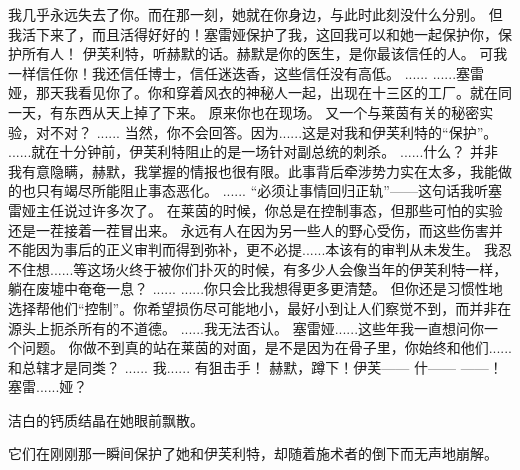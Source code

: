 \documentclass[openany]{book}
\begin{document}
\begin{dialogue}
     我几乎永远失去了你。而在那一刻，她就在你身边，与此时此刻没什么分别。
     但我活下来了，而且活得好好的！塞雷娅保护了我，这回我可以和她一起保护你，保护所有人！
     伊芙利特，听赫默的话。赫默是你的医生，是你最该信任的人。
     可我一样信任你！我还信任博士，信任迷迭香，这些信任没有高低。
     ......
     ......塞雷娅，那天我看见你了。你和穿着风衣的神秘人一起，出现在十三区的工厂。就在同一天，有东西从天上掉了下来。
     原来你也在现场。
     又一个与莱茵有关的秘密实验，对不对？
     ......
     当然，你不会回答。因为......这是对我和伊芙利特的“保护”。
     ......就在十分钟前，伊芙利特阻止的是一场针对副总统的刺杀。
     ......什么？
     并非我有意隐瞒，赫默，我掌握的情报也很有限。此事背后牵涉势力实在太多，我能做的也只有竭尽所能阻止事态恶化。
     ......
     “必须让事情回归正轨”——这句话我听塞雷娅主任说过许多次了。
     在莱茵的时候，你总是在控制事态，但那些可怕的实验还是一茬接着一茬冒出来。
     永远有人在因为另一些人的野心受伤，而这些伤害并不能因为事后的正义审判而得到弥补，更不必提......本该有的审判从未发生。
     我忍不住想......等这场火终于被你们扑灭的时候，有多少人会像当年的伊芙利特一样，躺在废墟中奄奄一息？
     ......
     ......你只会比我想得更多更清楚。
     但你还是习惯性地选择帮他们“控制”。你希望损伤尽可能地小，最好小到让人们察觉不到，而并非在源头上扼杀所有的不道德。
     ......我无法否认。
     塞雷娅......这些年我一直想问你一个问题。
     你做不到真的站在莱茵的对面，是不是因为在骨子里，你始终和他们......和总辖才是同类？
     ......
     我......
     有狙击手！
     赫默，蹲下！伊芙——
     什——
     ——！
     塞雷......娅？\par
    洁白的钙质结晶在她眼前飘散。\par
    它们在刚刚那一瞬间保护了她和伊芙利特，却随着施术者的倒下而无声地崩解。
\end{dialogue}
\end{document}
